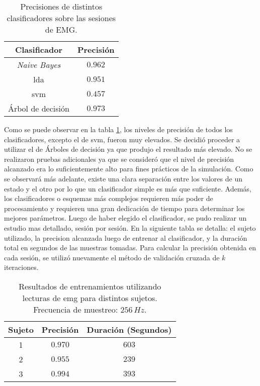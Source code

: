 \begin{table}[H]
\centering
\begin{tabular}{ |c|c| }
 \hline
 Clasificador & Precisión \\ 
 \hline
 \emph{Naive Bayes} & $0.962$ \\
 \hline
 \gls{lda} & $0.951$ \\
 \hline
  \gls{svm} & $0.457$ \\
 \hline
 Árbol de decisión & $0.973$ \\
 
 \hline
\end{tabular}
\caption{Precisiones de distintos clasificadores sobre las sesiones de EMG.}
\label{tab:emg-classifiers}
\end{table}

Como se puede observar en la tabla \ref{tab:emg-classifiers}, los niveles de precisión de todos los clasificadores, excepto el de \acrshort{svm}, fueron muy elevados. Se decidió proceder a utilizar el de Árboles de decisión ya que produjo el resultado más elevado. No se realizaron pruebas adicionales ya que se consideró que el nivel de precisión alcanzado era lo suficientemente alto para fines prácticos de la simulación. Como se observará más adelante, existe una clara separación entre los valores de un estado y el otro por lo que un clasificador simple es más que suficiente. Además, los clasificadores o esquemas más complejos requieren más poder de procesamiento y requieren una gran dedicación de tiempo para determinar los mejores parámetros. Luego de haber elegido el clasificador, se pudo realizar un estudio mas detallado, sesión por sesión. En la siguiente tabla se detalla: el sujeto utilizado, la precision alcanzada luego de entrenar al clasificador, y la duración total en segundos de las muestras tomadas. Para calcular la precisión obtenida en cada sesión, se utilizó nuevamente el método de validación cruzada de $k$ iteraciones.

\begin{table}[H]
\centering
\begin{tabular}{ |c|c|c| } 
 \hline
 Sujeto & Precisión & Duración (Segundos) \\ 
 \hline
 1 & $0.970$ & $603$ \\
  \hline
 2 & $0.955$ & $239$ \\
  \hline
 3 & $0.994$ & $393$ \\

 \hline
\end{tabular}
\caption{Resultados de entrenamientos utilizando lecturas de \acrshort{emg} para distintos sujetos. Frecuencia de muestreo: $256\,Hz$.}
\label{tab:emg-results}
\end{table}

